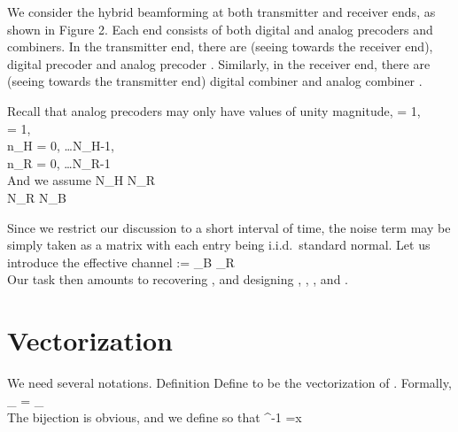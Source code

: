 We consider the hybrid beamforming at both transmitter and receiver ends, as shown in Figure 2.
Each end consists of both digital and analog precoders and combiners.
In the transmitter end, there are (seeing towards the receiver end), digital precoder  and analog precoder .
Similarly, in the receiver end, there are (seeing towards the transmitter end) digital combiner  and analog combiner .

Recall that analog precoders may only have values of unity magnitude,
%
 {
= 1, \\
%
= 1, \\
%
n_H
= 0, \dots N_H-1, \\
%
n_R
= 0, \dots N_R-1 \\
}
%
And we assume
%
 {
N_H \gg N_R \\
%
N_R \gg N_B \\
}

Since we restrict our discussion to a short interval of time, the noise term may be simply taken as a matrix  with each entry being i.i.d.\ standard normal.
Let us introduce the effective channel
%
 {
:= _B  _R  \\
}
%
Our task then amounts to recovering , and designing , , , and .



\section {Vectorization}

We need several notations.
%
\Result
{Definition}
{
Define  to be the vectorization of .
Formally,
%
 {
 _{}
= _{} \\
}
%
The bijection is obvious, and we define  so that
%
 {
 ^{-1} 
=x \\
}
}

